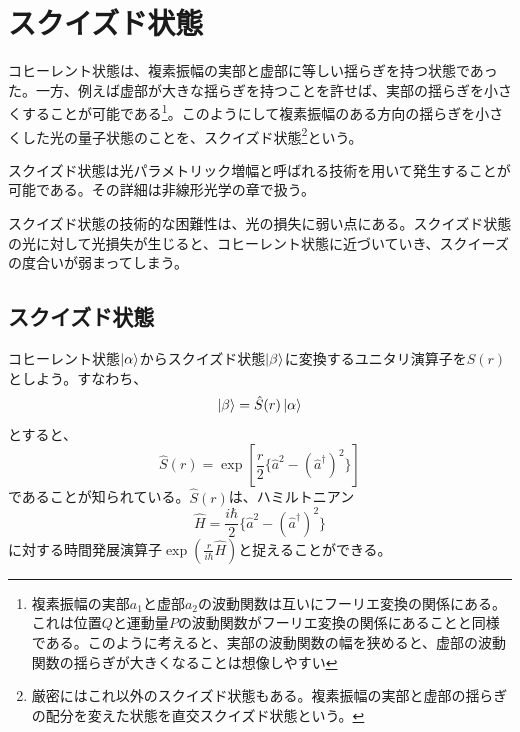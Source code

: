 \section{スクイズド状態}
コヒーレント状態は、複素振幅の実部と虚部に等しい揺らぎを持つ状態であった。一方、例えば虚部が大きな揺らぎを持つことを許せば、実部の揺らぎを小さくすることが可能である\footnote{複素振幅の実部$a_1$と虚部$a_2$の波動関数は互いにフーリエ変換の関係にある。これは位置$Q$と運動量$P$の波動関数がフーリエ変換の関係にあることと同様である。このように考えると、実部の波動関数の幅を狭めると、虚部の波動関数の揺らぎが大きくなることは想像しやすい}。このようにして複素振幅のある方向の揺らぎを小さくした光の量子状態のことを、スクイズド状態\footnote{厳密にはこれ以外のスクイズド状態もある。複素振幅の実部と虚部の揺らぎの配分を変えた状態を直交スクイズド状態という。}という。

スクイズド状態は光パラメトリック増幅と呼ばれる技術を用いて発生することが可能である。その詳細は非線形光学の章で扱う。

スクイズド状態の技術的な困難性は、光の損失に弱い点にある。スクイズド状態の光に対して光損失が生じると、コヒーレント状態に近づいていき、スクイーズの度合いが弱まってしまう。
\subsection{スクイズド状態}

コヒーレント状態$\ket \alpha$からスクイズド状態$\ket \beta$に変換するユニタリ演算子を$\hat S(r)$としよう。すなわち、
\begin{equation}
  \ket \beta = \hat S(r) \ket \alpha
\end{equation}
とすると、
\begin{equation}
  \hat S(r)=\exp\left[\frac r 2 \{\hat a^2 - (\hat a^\dagger)^2\}\right]
\end{equation}
であることが知られている。$\hat S(r)$は、ハミルトニアン
\begin{equation}
	\hat H = \frac{i\hbar}{2}\{\hat a^2 - (\hat a^\dagger)^2\}  
	\label{eq:squeezing_hamiltonian}
\end{equation}
に対する時間発展演算子$\exp\left(\frac{r}{i\hbar}\hat H\right)$と捉えることができる。

